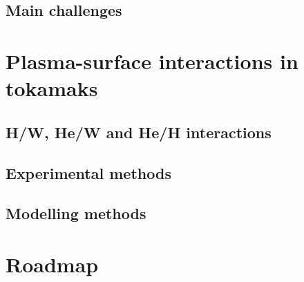\subsection{Main challenges}
\section{Plasma-surface interactions in tokamaks}
\lipsum[6]
\lipsum[6]

\subsection{H/W, He/W and He/H interactions}
\subsection{Experimental methods}
\subsection{Modelling methods}
\section{Roadmap}



